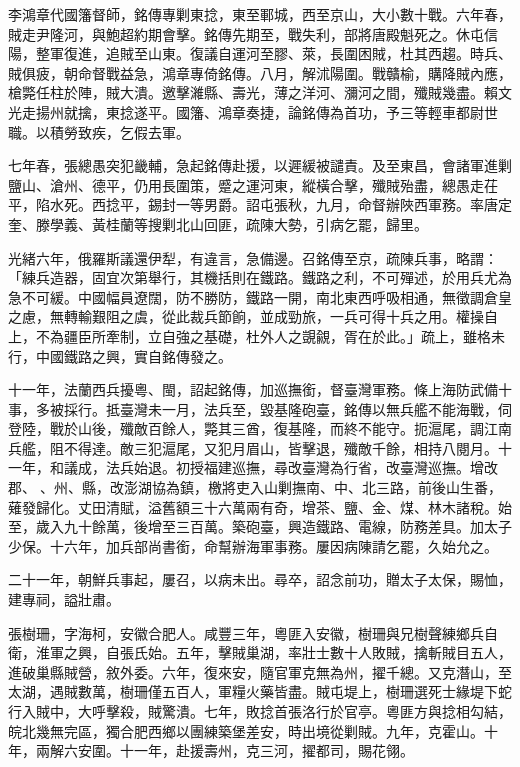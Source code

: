 \begin{pinyinscope}
李鴻章代國籓督師，銘傳專剿東捻，東至鄆城，西至京山，大小數十戰。六年春，賊走尹隆河，與鮑超約期會擊。銘傳先期至，戰失利，部將唐殿魁死之。休屯信陽，整軍復進，追賊至山東。復議自運河至膠、萊，長圍困賊，杜其西趨。時兵、賊俱疲，朝命督戰益急，鴻章專倚銘傳。八月，解沭陽圍。戰贛榆，購降賊內應，槍斃任柱於陣，賊大潰。邀擊濰縣、壽光，薄之洋河、瀰河之間，殲賊幾盡。賴文光走揚州就擒，東捻遂平。國籓、鴻章奏捷，論銘傳為首功，予三等輕車都尉世職。以積勞致疾，乞假去軍。

七年春，張總愚突犯畿輔，急起銘傳赴援，以遲緩被譴責。及至東昌，會諸軍進剿鹽山、滄州、德平，仍用長圍策，蹙之運河東，縱橫合擊，殲賊殆盡，總愚走茌平，陷水死。西捻平，錫封一等男爵。詔屯張秋，九月，命督辦陜西軍務。率唐定奎、滕學義、黃桂蘭等搜剿北山回匪，疏陳大勢，引病乞罷，歸里。

光緒六年，俄羅斯議還伊犁，有違言，急備邊。召銘傳至京，疏陳兵事，略謂：「練兵造器，固宜次第舉行，其機括則在鐵路。鐵路之利，不可殫述，於用兵尤為急不可緩。中國幅員遼闊，防不勝防，鐵路一開，南北東西呼吸相通，無徵調倉皇之慮，無轉輸艱阻之虞，從此裁兵節餉，並成勁旅，一兵可得十兵之用。權操自上，不為疆臣所牽制，立自強之基礎，杜外人之覬覦，胥在於此。」疏上，雖格未行，中國鐵路之興，實自銘傳發之。

十一年，法蘭西兵擾粵、閩，詔起銘傳，加巡撫銜，督臺灣軍務。條上海防武備十事，多被採行。抵臺灣未一月，法兵至，毀基隆砲臺，銘傳以無兵艦不能海戰，伺登陸，戰於山後，殲敵百餘人，斃其三酋，復基隆，而終不能守。扼滬尾，調江南兵艦，阻不得達。敵三犯滬尾，又犯月眉山，皆擊退，殲敵千餘，相持八閱月。十一年，和議成，法兵始退。初授福建巡撫，尋改臺灣為行省，改臺灣巡撫。增改郡、、州、縣，改澎湖協為鎮，檄將吏入山剿撫南、中、北三路，前後山生番，薙發歸化。丈田清賦，溢舊額三十六萬兩有奇，增茶、鹽、金、煤、林木諸稅。始至，歲入九十餘萬，後增至三百萬。築砲臺，興造鐵路、電線，防務差具。加太子少保。十六年，加兵部尚書銜，命幫辦海軍事務。屢因病陳請乞罷，久始允之。

二十一年，朝鮮兵事起，屢召，以病未出。尋卒，詔念前功，贈太子太保，賜恤，建專祠，謚壯肅。

張樹珊，字海柯，安徽合肥人。咸豐三年，粵匪入安徽，樹珊與兄樹聲練鄉兵自衛，淮軍之興，自張氏始。五年，擊賊巢湖，率壯士數十人敗賊，擒斬賊目五人，進破巢縣賊營，敘外委。六年，復來安，隨官軍克無為州，擢千總。又克潛山，至太湖，遇賊數萬，樹珊僅五百人，軍糧火藥皆盡。賊屯堤上，樹珊選死士緣堤下蛇行入賊中，大呼擊殺，賊驚潰。七年，敗捻首張洛行於官亭。粵匪方與捻相勾結，皖北幾無完區，獨合肥西鄉以團練築堡差安，時出境從剿賊。九年，克霍山。十年，兩解六安圍。十一年，赴援壽州，克三河，擢都司，賜花翎。


\end{pinyinscope}
